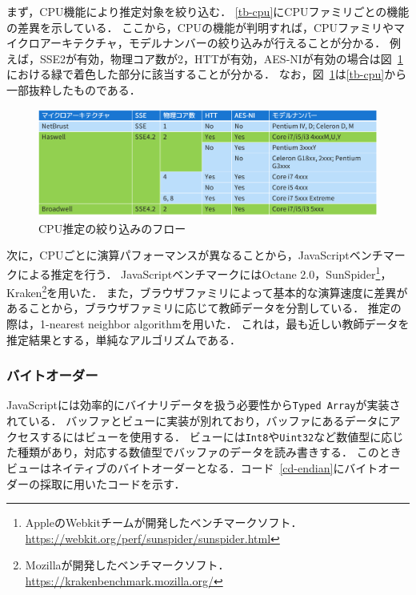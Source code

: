 まず，CPU機能により推定対象を絞り込む．
\ref{tb-cpu}にCPUファミリごとの機能の差異を示している．
ここから，CPUの機能が判明すれば，CPUファミリやマイクロアーキテクチャ，モデルナンバーの絞り込みが行えることが分かる．
例えば，SSE2が有効，物理コア数が2，HTTが有効，AES-NIが有効の場合は図~\ref{fig-cpu_est}における緑で着色した部分に該当することが分かる．
なお，図~\ref{fig-cpu_est}は\ref{tb-cpu}から一部抜粋したものである．

\begin{figure}[H]
	\centering
    \includegraphics[width=\textwidth,pagebox=artbox]{fig/cpu_est.png}
    \caption{CPU推定の絞り込みのフロー}
    \label{fig-cpu_est}
\end{figure}

次に，CPUごとに演算パフォーマンスが異なることから，JavaScriptベンチマークによる推定を行う．
JavaScriptベンチマークにはOctane 2.0，SunSpider\footnote{AppleのWebkitチームが開発したベンチマークソフト．\url{https://webkit.org/perf/sunspider/sunspider.html}}，Kraken\footnote{Mozillaが開発したベンチマークソフト．\url{https://krakenbenchmark.mozilla.org/}}を用いた．
また，ブラウザファミリによって基本的な演算速度に差異があることから，ブラウザファミリに応じて教師データを分割している．
推定の際は，1-nearest neighbor algorithmを用いた．
これは，最も近しい教師データを推定結果とする，単純なアルゴリズムである．

\subsubsection{バイトオーダー}
JavaScriptには効率的にバイナリデータを扱う必要性から\texttt{Typed Array}が実装されている．
バッファとビューに実装が別れており，バッファにあるデータにアクセスするにはビューを使用する．
ビューには\texttt{Int8}や\texttt{Uint32}など数値型に応じた種類があり，対応する数値型でバッファのデータを読み書きする．
このときビューはネイティブのバイトオーダーとなる．コード~\ref{cd-endian}にバイトオーダーの採取に用いたコードを示す．



